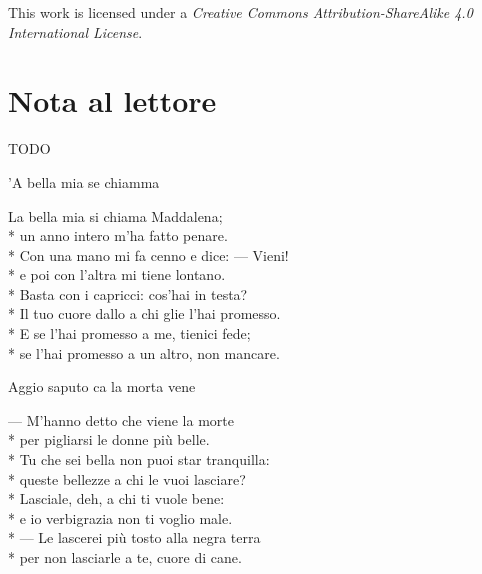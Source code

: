 \documentclass[11pt]{book}
\newenvironment{bottompar}{\par\vspace*{\fill}}{\clearpage}
\begin{document}
\maketitle
\makededication

\frontmatter

\newpage
\thispagestyle{empty}

\begin{bottompar}
This work is licensed under a \emph{Creative Commons Attribution-ShareAlike 4.0 International License}.
\end{bottompar}

\section{Nota al lettore}

TODO

\newpage
\thispagestyle{empty}

\renewcommand*{\topname}{Canzune} %
\maketop

\mainmatter

\begin{poem}{’A bella mia se chiamma}{}
\settowidth{\versewidth}{Il tuo cuore dallo a chi glie l’hai promesso}
\begin{altverse}
La bella mia si chiama Maddalena;\\*
un anno intero m’ha fatto penare.\\*
Con una mano mi fa cenno e dice: — Vieni!\\*
e poi con l’altra mi tiene lontano.\\*
Basta con i capricci: cos’hai in testa?\\*
Il tuo cuore dallo a chi glie l’hai promesso.\\*
E se l’hai promesso a me, tienici fede;\\*
se l’hai promesso a un altro, non mancare.
\end{altverse}
\end{poem}

\begin{poem}{Aggio saputo ca la morta vene}{}
\settowidth{\versewidth}{Tu che sei bella non puoi star tranquilla}
\begin{altverse}
— M’hanno detto che viene la morte\\*
per pigliarsi le donne più belle.\\*
Tu che sei bella non puoi star tranquilla:\\*
queste bellezze a chi le vuoi lasciare?\\*
Lasciale, deh, a chi ti vuole bene:\\*
e io verbigrazia non ti voglio male.\\*
— Le lascerei più tosto alla negra terra\\*
per non lasciarle a te, cuore di cane.
\end{altverse}
\end{poem}
\end{document}
